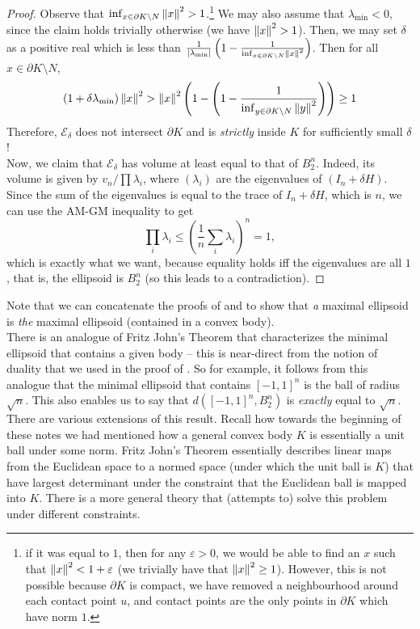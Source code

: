 \begin{proof}
Observe that $\inf_{x\in\partial K\setminus N} \left\lVert x\right\rVert^2 > 1$.\footnote{if it was equal to $1$, then for any $\varepsilon>0$, we would be able to find an $x$ such that $\left\lVert x\right\rVert^2 < 1+\varepsilon$ (we trivially have that $\left\lVert x\right\rVert^2 \geq 1$). However, this is not possible because $\partial K$ is compact, we have removed a neighbourhood around each contact point $u$, and contact points are the only points in $\partial K$ which have norm $1$.} We may also assume that $\lambda_{\min} < 0$, since the claim holds trivially otherwise (we have $\left\lVert x\right\rVert^2 > 1$).  Then, we may set $\delta$ as a positive real which is less than $\frac{1}{|\lambda_{\min}|}\left(1 - \frac{1}{\inf_{x\in\partial K\setminus N}\left\lVert x\right\rVert^2}\right)$. Then for all $x\in\partial K\setminus N$,
\[ (1+\delta\lambda_{\min})\left\lVert x\right\rVert^2 > \left\lVert x\right\rVert^2 \left(1 - \left(1 - \frac{1}{\inf_{y\in\partial K\setminus N}\left\lVert y\right\rVert^2}\right)\right) \geq 1 \]
Therefore, $\mathcal{E}_\delta$ does not intersect $\partial K$ and is \textit{strictly} inside $K$ for sufficiently small $\delta$! \\

Now, we claim that $\mathcal{E}_\delta$ has volume at least equal to that of $B_2^n$. Indeed, its volume is given by $v_n / \prod\lambda_i$, where $(\lambda_i)$ are the eigenvalues of $(I_n+\delta H)$. Since the sum of the eigenvalues is equal to the trace of $I_n+\delta H$, which is $n$, we can use the AM-GM inequality to get
\[ \prod_i \lambda_i \leq \left(\frac{1}{n}\sum_i \lambda_i\right)^n = 1, \]
which is exactly what we want, because equality holds iff the eigenvalues are all $1$, that is, the ellipsoid is $B_2^n$ (so this leads to a contradiction).
\end{proof}

Note that we can concatenate the proofs of  and  to show that \textit{a} maximal ellipsoid is \textit{the} maximal ellipsoid (contained in a convex body).\\

There is an analogue of Fritz John's Theorem that characterizes the minimal ellipsoid that contains a given body -- this is near-direct from the notion of duality that we used in the proof of . So for example, it follows from this analogue that the minimal ellipsoid that contains $[-1,1]^n$ is the ball of radius $\sqrt{n}$. This also enables us to say that $d([-1,1]^n, B_2^n)$ is \textit{exactly} equal to $\sqrt{n}$.\\

There are various extensions of this result. Recall how towards the beginning of these notes we had mentioned how a general convex body $K$ is essentially a unit ball under some norm. Fritz John's Theorem essentially describes linear maps from the Euclidean space to a normed space (under which the unit ball is $K$) that have largest determinant under the constraint that the Euclidean ball is mapped into $K$. There is a more general theory that (attempts to) solve this problem under different constraints.